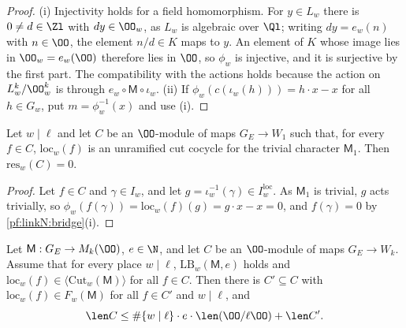 \begin{proof}
(i) Injectivity holds for a field homomorphism. For $y\in L_w$ there is $0\ne d\in\Zl$ with $dy\in\OO_w$, as $L_w$ is algebraic over $\Ql$;
writing $dy=e_w(n)$ with $n\in\OO$, the element $n/d\in K$ maps to $y$. An element of $K$ whose image lies in $\OO_w=e_w(\OO)$ therefore lies in
$\OO$, so $\phi_w$ is injective, and it is surjective by the first part. The compatibility with the actions holds because the action on
$L_w^k/\OO_w^k$ is through $e_w\circ\mathsf M\circ\iota_w$.
(ii) If $\phi_w(c(\iota_w(h)))=h\cdot x-x$ for all $h\in G_w$, put $m=\phi_w^{-1}(x)$ and use (i).
\end{proof}

\begin{lemma}\label{pf:linkN:cuttrivine}
Let $w\mid\ell$ and let $C$ be an $\OO$-module of maps $G_E\to W_1$ such that, for every $f\in C$, $\mathrm{loc}_w(f)$ is an unramified cut cocycle
for the trivial character $\mathsf M_1$. Then $\mathrm{res}_w(C)=0$.
\end{lemma}

\begin{proof}
Let $f\in C$ and $\gamma\in I_w$, and let $g=\iota_w^{-1}(\gamma)\in I^{\mathrm{loc}}_w$. As $\mathsf M_1$ is trivial, $g$ acts trivially, so
$\phi_w(f(\gamma))=\mathrm{loc}_w(f)(g)=g\cdot x-x=0$, and $f(\gamma)=0$ by \cref{pf:linkN:bridge}(i).
\end{proof}

\begin{lemma}\label{pf:linkN:countL}
Let $\mathsf M:G_E\to M_k(\OO)$, $e\in\N$, and let $C$ be an $\OO$-module of maps $G_E\to W_k$. Assume that for every place $w\mid\ell$,
$\mathrm{LB}_w(\mathsf M,e)$ holds and $\mathrm{loc}_w(f)\in\langle\mathrm{Cut}_w(\mathsf M)\rangle$ for all $f\in C$. Then there is $C'\subseteq C$ with
$\mathrm{loc}_w(f)\in F_w(\mathsf M)$ for all $f\in C'$ and $w\mid\ell$, and
\[
\len C\le\#\{w\mid\ell\}\cdot e\cdot\len(\OO/\ell\OO)+\len C'.
\]
\end{lemma}

